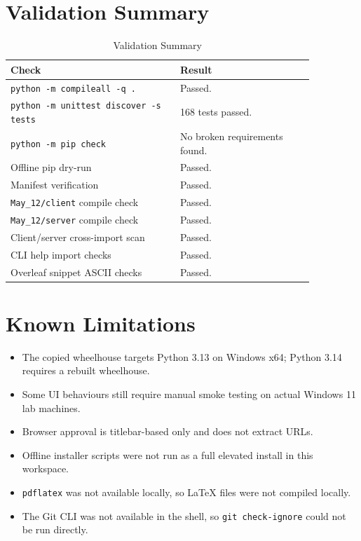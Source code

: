 \documentclass[conference]{IEEEtran}
\begin{document}
\section{Validation Summary}

\begin{table}[htbp]
\caption{Validation Summary}
\centering
\begin{tabular}{P{0.48\linewidth} P{0.38\linewidth}}
\toprule
\textbf{Check} & \textbf{Result} \\
\midrule
\texttt{python -m compileall -q .} & Passed. \\
\texttt{python -m unittest discover -s tests} & 168 tests passed. \\
\texttt{python -m pip check} & No broken requirements found. \\
Offline pip dry-run & Passed. \\
Manifest verification & Passed. \\
\texttt{May\_12/client} compile check & Passed. \\
\texttt{May\_12/server} compile check & Passed. \\
Client/server cross-import scan & Passed. \\
CLI help import checks & Passed. \\
Overleaf snippet ASCII checks & Passed. \\
\bottomrule
\end{tabular}
\label{tab:validation}
\end{table}

\section{Known Limitations}

\begin{itemize}
    \item The copied wheelhouse targets Python 3.13 on Windows x64; Python 3.14 requires a rebuilt wheelhouse.
    \item Some UI behaviours still require manual smoke testing on actual Windows 11 lab machines.
    \item Browser approval is titlebar-based only and does not extract URLs.
    \item Offline installer scripts were not run as a full elevated install in this workspace.
    \item \texttt{pdflatex} was not available locally, so LaTeX files were not compiled locally.
    \item The Git CLI was not available in the shell, so \texttt{git check-ignore} could not be run directly.
\end{itemize}
\end{document}
